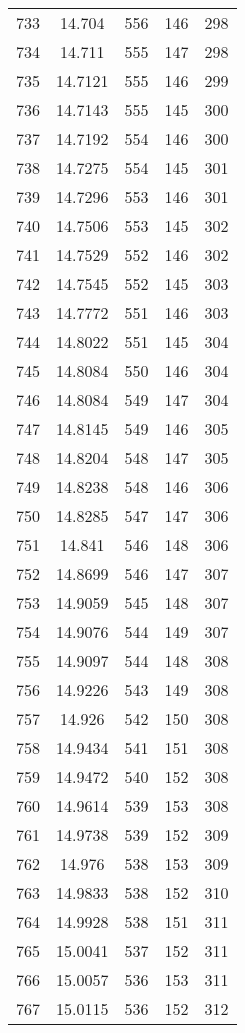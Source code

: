 \documentclass[12pt,a4paper]{article}
\begin{document}
\begin{tabular}{r|cccc}
	733 & 14.704 & 556 & 146 & 298 \\
	734 & 14.711 & 555 & 147 & 298 \\
	735 & 14.7121 & 555 & 146 & 299 \\
	736 & 14.7143 & 555 & 145 & 300 \\
	737 & 14.7192 & 554 & 146 & 300 \\
	738 & 14.7275 & 554 & 145 & 301 \\
	739 & 14.7296 & 553 & 146 & 301 \\
	740 & 14.7506 & 553 & 145 & 302 \\
	741 & 14.7529 & 552 & 146 & 302 \\
	742 & 14.7545 & 552 & 145 & 303 \\
	743 & 14.7772 & 551 & 146 & 303 \\
	744 & 14.8022 & 551 & 145 & 304 \\
	745 & 14.8084 & 550 & 146 & 304 \\
	746 & 14.8084 & 549 & 147 & 304 \\
	747 & 14.8145 & 549 & 146 & 305 \\
	748 & 14.8204 & 548 & 147 & 305 \\
	749 & 14.8238 & 548 & 146 & 306 \\
	750 & 14.8285 & 547 & 147 & 306 \\
	751 & 14.841 & 546 & 148 & 306 \\
	752 & 14.8699 & 546 & 147 & 307 \\
	753 & 14.9059 & 545 & 148 & 307 \\
	754 & 14.9076 & 544 & 149 & 307 \\
	755 & 14.9097 & 544 & 148 & 308 \\
	756 & 14.9226 & 543 & 149 & 308 \\
	757 & 14.926 & 542 & 150 & 308 \\
	758 & 14.9434 & 541 & 151 & 308 \\
	759 & 14.9472 & 540 & 152 & 308 \\
	760 & 14.9614 & 539 & 153 & 308 \\
	761 & 14.9738 & 539 & 152 & 309 \\
	762 & 14.976 & 538 & 153 & 309 \\
	763 & 14.9833 & 538 & 152 & 310 \\
	764 & 14.9928 & 538 & 151 & 311 \\
	765 & 15.0041 & 537 & 152 & 311 \\
	766 & 15.0057 & 536 & 153 & 311 \\
	767 & 15.0115 & 536 & 152 & 312 \\

\end{tabular}
\end{document}
